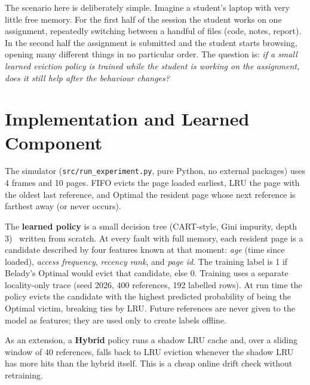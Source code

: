 \documentclass[10pt,a4paper]{article}
\begin{document}
The scenario here is deliberately simple. Imagine a student's laptop with very little free memory. For the first half of the session the student works on one assignment, repeatedly switching between a handful of files (code, notes, report). In the second half the assignment is submitted and the student starts browsing, opening many different things in no particular order. The question is: \emph{if a small learned eviction policy is trained while the student is working on the assignment, does it still help after the behaviour changes?}

\section{Implementation and Learned Component}
The simulator (\texttt{src/run\_experiment.py}, pure Python, no external packages) uses 4 frames and 10 pages. FIFO evicts the page loaded earliest, LRU the page with the oldest last reference, and Optimal the resident page whose next reference is farthest away (or never occurs).

The \textbf{learned policy} is a small decision tree (CART-style, Gini impurity, depth 3)~\cite{cart} written from scratch. At every fault with full memory, each resident page is a candidate described by four features known at that moment: \emph{age} (time since loaded), \emph{access frequency}, \emph{recency rank}, and \emph{page id}. The training label is 1 if Belady's Optimal would evict that candidate, else 0. Training uses a separate locality-only trace (seed 2026, 400 references, 192 labelled rows). At run time the policy evicts the candidate with the highest predicted probability of being the Optimal victim, breaking ties by LRU. Future references are never given to the model as features; they are used only to create labels offline.

As an extension, a \textbf{Hybrid} policy runs a shadow LRU cache and, over a sliding window of 40 references, falls back to LRU eviction whenever the shadow LRU has more hits than the hybrid itself. This is a cheap online drift check without retraining.
\end{document}
